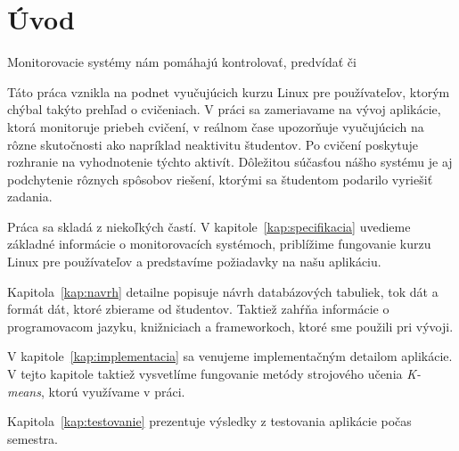 \chapter*{Úvod} %

Monitorovacie systémy nám pomáhajú kontrolovať, predvídať či 

Táto práca vznikla na podnet vyučujúcich kurzu Linux pre používateľov, ktorým chýbal
takýto prehľad o cvičeniach. V práci sa zameriavame na vývoj aplikácie, ktorá
monitoruje priebeh cvičení, v reálnom čase upozorňuje vyučujúcich na rôzne skutočnosti
ako napríklad neaktivitu študentov.
Po cvičení poskytuje rozhranie na vyhodnotenie týchto aktivít. Dôležitou súčasťou
nášho systému je aj podchytenie rôznych spôsobov riešení, ktorými  sa študentom
podarilo vyriešiť zadania.

Práca sa skladá z niekoľkých častí. V kapitole~\ref{kap:specifikacia} uvedieme základné
informácie o monitorovacích systémoch, priblížime fungovanie kurzu Linux pre používateľov
a predstavíme požiadavky na našu aplikáciu.

Kapitola~\ref{kap:navrh} detailne popisuje návrh databázových tabuliek, tok dát a
formát dát, ktoré zbierame od študentov. Taktiež zahŕňa informácie o programovacom jazyku,
knižniciach a frameworkoch, ktoré sme použili pri vývoji.

V kapitole~\ref{kap:implementacia} sa venujeme implementačným detailom aplikácie. V tejto
kapitole taktiež vysvetlíme fungovanie metódy strojového učenia \textit{K-means}, ktorú
využívame v práci.

Kapitola~\ref{kap:testovanie} prezentuje výsledky z testovania aplikácie počas semestra.